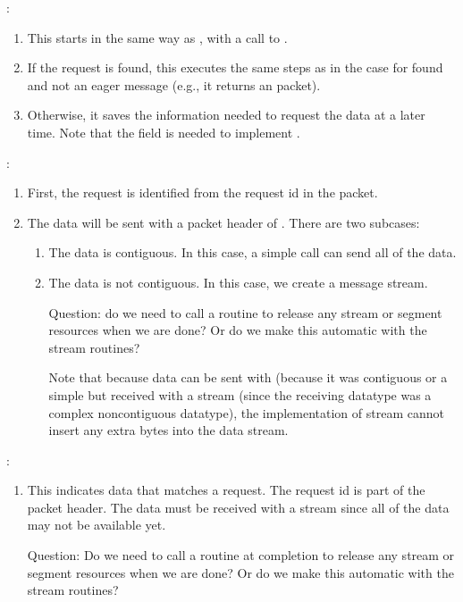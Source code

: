 :
\begin{enumerate}
\item This starts in the same way as , with a call
  to .  

\item If the request is found, this executes the same steps as in the
   case for found and not an eager message (e.g., it
  returns an  packet).

\item Otherwise, it saves the information needed to request the data at a
  later time. Note
  that the  field is needed to
  implement . 
\end{enumerate}

:
\begin{enumerate}
\item First, the request is identified from the request id in the packet.

\item The data will be sent with a packet header of
  .  There are two subcases:
  \begin{enumerate}
  \item The data is contiguous.  In this case, a simple 
    call can send all of the data.

  \item The data is not contiguous.  In this case, we create a message
    stream.  

   Question: do we need to call a routine to release any stream or segment
   resources when we are done?  Or do we make this automatic with the stream
   routines? 

   Note that because data can be sent with  (because it
   was contiguous or a simple  but received with a stream (since
   the receiving datatype was a complex noncontiguous datatype), the
   implementation of stream cannot insert any extra bytes into the data
   stream.  

  \end{enumerate}
\end{enumerate}

:
\begin{enumerate}
\item This indicates data that matches a request.  The request id is part of
  the packet header.  The data must be received with a stream since all of the
  data may not be available yet.  

  Question: Do we need to call a routine at completion to release any stream
  or segment resources when we are done? Or do we make this automatic with the
  stream routines?

\end{enumerate}

